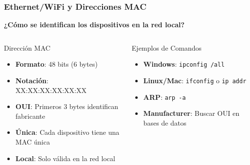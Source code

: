 \documentclass[aspectratio=169]{beamer}
\begin{document}
      \begin{frame}
      \frametitle{Ethernet/WiFi y Direcciones MAC}
      
      \begin{center}
      \Large \textbf{¿Cómo se identifican los dispositivos en la red local?}
      \end{center}
      
      \begin{columns}
      \begin{block}{Dirección MAC}
      \begin{itemize}
      \item \textbf{Formato}: 48 bits (6 bytes)
      \item \textbf{Notación}: XX:XX:XX:XX:XX:XX
      \item \textbf{OUI}: Primeros 3 bytes identifican fabricante
      \item \textbf{Única}: Cada dispositivo tiene una MAC única
      \item \textbf{Local}: Solo válida en la red local
      \end{itemize}
      \end{block}
      
      \begin{block}{Ejemplos de Comandos}
      \begin{itemize}
      \item \textbf{Windows}: \texttt{ipconfig /all}
      \item \textbf{Linux/Mac}: \texttt{ifconfig} o \texttt{ip addr}
      \item \textbf{ARP}: \texttt{arp -a}
      \item \textbf{Manufacturer}: Buscar OUI en bases de datos
      \end{itemize}
      \end{block}
      \end{columns}
    \end{frame}
\end{document}
